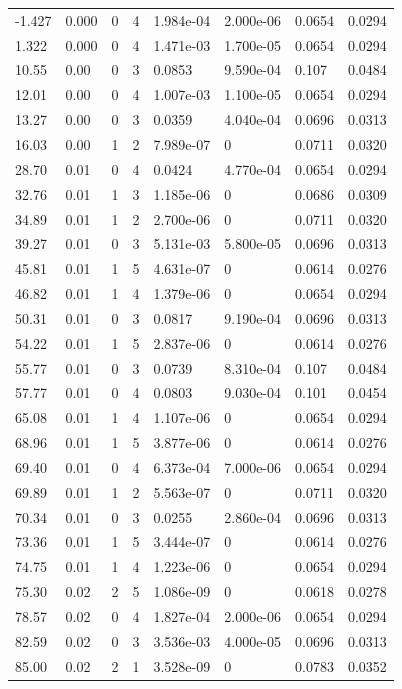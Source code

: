 \documentclass[preview]{standalone}
\begin{document}
{{\begin{tabular}{L{1.2cm}C{1.2cm} C{0.3cm}C{0.5cm} C{1.4cm}C{1.4cm} C{1.4cm}C{1.4cm}}
  -1.427  &  0.000  & 0     &  4 &  1.984e-04  & 2.000e-06  & 0.0654 &  0.0294   \\ 
  1.322  &  0.000  & 0     &  4 &  1.471e-03  & 1.700e-05  & 0.0654 &  0.0294   \\ 
  10.55  &  0.00  & 0     &  3 &  0.0853  & 9.590e-04  & 0.107 &  0.0484   \\ 
  12.01  &  0.00  & 0     &  4 &  1.007e-03  & 1.100e-05  & 0.0654 &  0.0294   \\ 
  13.27  &  0.00  & 0     &  3 &  0.0359  & 4.040e-04  & 0.0696 &  0.0313   \\ 
  16.03  &  0.00  & 1     &  2 &  7.989e-07  & 0  & 0.0711 &  0.0320   \\ 
  28.70  &  0.01  & 0     &  4 &  0.0424  & 4.770e-04  & 0.0654 &  0.0294   \\ 
  32.76  &  0.01  & 1     &  3 &  1.185e-06  & 0  & 0.0686 &  0.0309   \\ 
  34.89  &  0.01  & 1     &  2 &  2.700e-06  & 0  & 0.0711 &  0.0320   \\ 
  39.27  &  0.01  & 0     &  3 &  5.131e-03  & 5.800e-05  & 0.0696 &  0.0313   \\ 
  45.81  &  0.01  & 1     &  5 &  4.631e-07  & 0  & 0.0614 &  0.0276   \\ 
  46.82  &  0.01  & 1     &  4 &  1.379e-06  & 0  & 0.0654 &  0.0294   \\ 
  50.31  &  0.01  & 0     &  3 &  0.0817  & 9.190e-04  & 0.0696 &  0.0313   \\ 
  54.22  &  0.01  & 1     &  5 &  2.837e-06  & 0  & 0.0614 &  0.0276   \\ 
  55.77  &  0.01  & 0     &  3 &  0.0739  & 8.310e-04  & 0.107 &  0.0484   \\ 
  57.77  &  0.01  & 0     &  4 &  0.0803  & 9.030e-04  & 0.101 &  0.0454   \\ 
  65.08  &  0.01  & 1     &  4 &  1.107e-06  & 0  & 0.0654 &  0.0294   \\ 
  68.96  &  0.01  & 1     &  5 &  3.877e-06  & 0  & 0.0614 &  0.0276   \\ 
  69.40  &  0.01  & 0     &  4 &  6.373e-04  & 7.000e-06  & 0.0654 &  0.0294   \\ 
  69.89  &  0.01  & 1     &  2 &  5.563e-07  & 0  & 0.0711 &  0.0320   \\ 
  70.34  &  0.01  & 0     &  3 &  0.0255  & 2.860e-04  & 0.0696 &  0.0313   \\ 
  73.36  &  0.01  & 1     &  5 &  3.444e-07  & 0  & 0.0614 &  0.0276   \\ 
  74.75  &  0.01  & 1     &  4 &  1.223e-06  & 0  & 0.0654 &  0.0294   \\ 
  75.30  &  0.02  & 2     &  5 &  1.086e-09  & 0  & 0.0618 &  0.0278   \\ 
  78.57  &  0.02  & 0     &  4 &  1.827e-04  & 2.000e-06  & 0.0654 &  0.0294   \\ 
  82.59  &  0.02  & 0     &  3 &  3.536e-03  & 4.000e-05  & 0.0696 &  0.0313   \\ 
  85.00  &  0.02  & 2     &  1 &  3.528e-09  & 0  & 0.0783 &  0.0352   \\ 
\hline 
\end{tabular} 

}}
\end{document}
